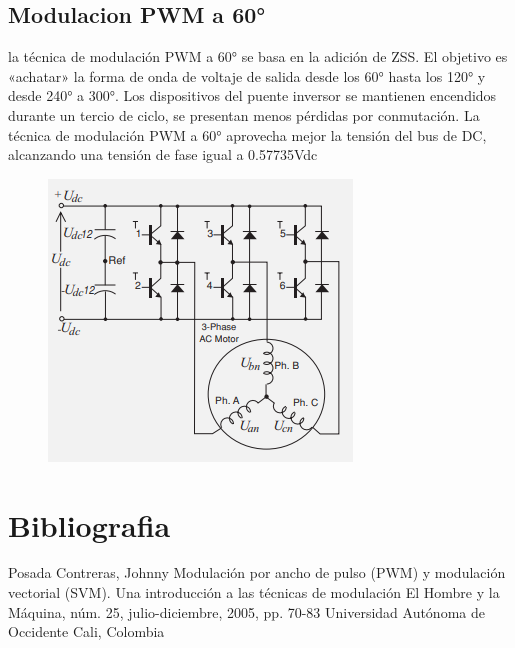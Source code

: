 \documentclass[12pt,a4paper]{article}
\begin{document}
\subsection{Modulacion PWM a 60°}
la técnica de modulación PWM a
60° se basa en la adición de ZSS.
El objetivo es «achatar» la forma de
onda de voltaje de salida desde los
60° hasta los 120° y desde 240° a
300°. Los dispositivos del puente
inversor se mantienen encendidos
durante un tercio de ciclo, se presentan menos pérdidas por conmutación. La técnica de modulación
PWM a 60° aprovecha mejor la tensión del bus de DC, alcanzando una
tensión de fase igual a 0.57735Vdc
\begin{figure}[h!]
\centering
\includegraphics[scale=1]{Captura4.PNG} 
\end{figure}
\section{Bibliografia}
Posada Contreras, Johnny
Modulación por ancho de pulso (PWM) y modulación vectorial (SVM). Una introducción a las técnicas
de modulación
El Hombre y la Máquina, núm. 25, julio-diciembre, 2005, pp. 70-83
Universidad Autónoma de Occidente
Cali, Colombia
\end{document}
